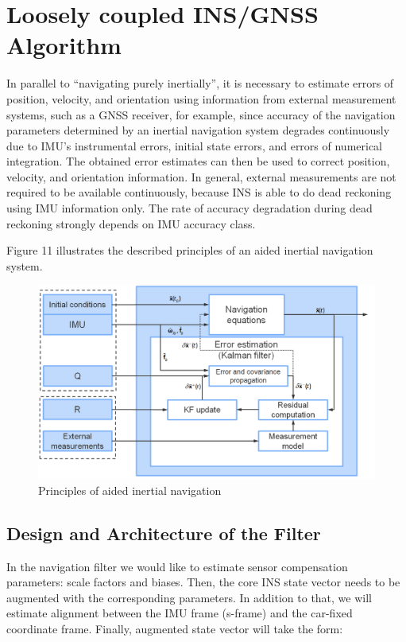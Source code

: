\documentclass[conference]{IEEEtran}
\begin{document}
\section{Loosely coupled INS/GNSS Algorithm}
In parallel to “navigating purely inertially”, it is necessary to estimate errors of position, velocity, and orientation using information from external measurement systems, such as a GNSS receiver, for example, since accuracy of the navigation parameters determined by an inertial navigation system degrades continuously due to IMU's instrumental errors, initial state errors, and errors of numerical integration. The obtained error estimates can then be used to correct position, velocity, and orientation information. In general, external measurements are not required to be available continuously, because INS is able to do dead reckoning using IMU information only. The rate of accuracy degradation during dead reckoning strongly depends on IMU accuracy class.

Figure 11 illustrates the described principles of an aided inertial navigation system.
\begin{figure}[htbp]
    \centerline{\includegraphics[width=1.0\columnwidth]{overframe.png}}
    \caption{Principles of aided inertial navigation}
\end{figure}

\subsection{Design and Architecture of the Filter}
In the navigation filter we would like to estimate sensor compensation parameters: scale factors and biases. Then, the core INS state vector needs to be augmented with the corresponding parameters. In addition to that, we will estimate alignment between the IMU frame (s-frame) and the car-fixed coordinate frame. Finally, augmented state vector will take the form:
\end{document}
